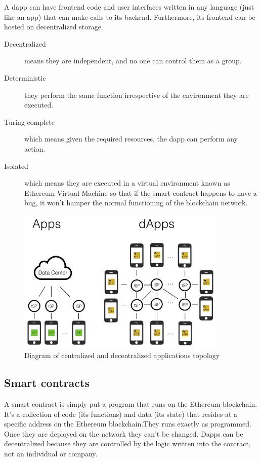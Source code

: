 A dapp can have frontend code and user interfaces written in any language (just like an app) that can make calls to its backend. Furthermore, its frontend can be hosted on decentralized storage.

\begin{description}
\item[Decentralized] means they are independent, and no one can control them as a group.
\item[Deterministic] they perform the same function irrespective of the environment they are executed.
\item[Turing complete] which means given the required resources, the dapp can perform any action.
\item[Isolated] which means they are executed in a virtual environment known as Ethereum Virtual Machine so that if the smart contract happens to have a bug, it won’t hamper the normal functioning of the blockchain network.
\end{description}

\begin{figure}[H]
	\centering
		\includegraphics[width=10cm]{images/chapter2/dapps.png}
		\caption{{\footnotesize Diagram of centralized and decentralized applications topology}}
\end{figure}

\subsection{Smart contracts}

A smart contract is simply put a program that runs on the Ethereum blockchain. It's a collection of code (its functions) and data (its state) that resides at a specific address on the Ethereum blockchain.They runs exactly as programmed. Once they are deployed on the network they can't be changed. Dapps can be decentralized because they are controlled by the logic written into the contract, not an individual or company.

